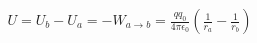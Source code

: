 \documentclass[preview]{standalone}
\begin{document}
\begin{align*}
U = U_b - U_a = - W_{a \rightarrow b} = \frac{q q_0}{4 \pi \epsilon_0} \left( \frac{1}{r_a} - \frac{1}{r_b} \right)
\end{align*}
\end{document}
